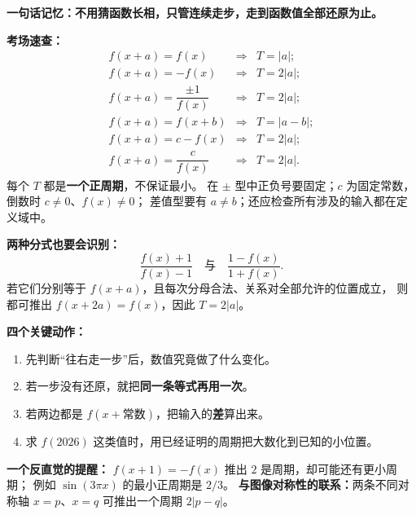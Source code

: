 \clearpage
\begin{summarybox}
\textbf{一句话记忆：\quad 不用猜函数长相，只管连续走步，走到函数值全部还原为止。}

\textbf{考场速查：}
\[
\begin{array}{rcl}
 f(x+a)=f(x)&\Rightarrow&T=|a|;\\[3pt]
 f(x+a)=-f(x)&\Rightarrow&T=2|a|;\\[3pt]
 f(x+a)=\dfrac{\pm1}{f(x)}&\Rightarrow&T=2|a|;\\[7pt]
 f(x+a)=f(x+b)&\Rightarrow&T=|a-b|;\\[3pt]
 f(x+a)=c-f(x)&\Rightarrow&T=2|a|;\\[3pt]
 f(x+a)=\dfrac{c}{f(x)}&\Rightarrow&T=2|a|.
\end{array}
\]
每个 $T$ 都是\textbf{一个正周期}，不保证最小。
在 $\pm$ 型中正负号要固定；$c$ 为固定常数，倒数时 $c\ne0$、$f(x)\ne0$；
差值型要有 $a\ne b$；还应检查所有涉及的输入都在定义域中。

\textbf{两种分式也要会识别：}
\[
 \frac{f(x)+1}{f(x)-1}\quad\text{与}\quad\frac{1-f(x)}{1+f(x)}.
\]
若它们分别等于 $f(x+a)$，且每次分母合法、关系对全部允许的位置成立，
则都可推出 $\boxed{f(x+2a)=f(x)}$，因此 $\boxed{T=2|a|}$。

\textbf{四个关键动作：}
\begin{enumerate}[leftmargin=*,itemsep=0.35em]
\item 先判断“往右走一步”后，数值究竟做了什么变化。
\item 若一步没有还原，就把\textbf{同一条等式再用一次}。
\item 若两边都是 $f(x+\text{常数})$，把输入的\textbf{差}算出来。
\item 求 $f(2026)$ 这类值时，用已经证明的周期把大数化到已知的小位置。
\end{enumerate}

\textbf{一个反直觉的提醒：} $f(x+1)=-f(x)$ 推出 $2$ 是周期，却可能还有更小周期；
例如 $\sin(3\pi x)$ 的最小正周期是 $2/3$。
\textbf{与图像对称性的联系：}两条不同对称轴 $x=p$、$x=q$ 可推出一个周期 $2|p-q|$。
\end{summarybox}
